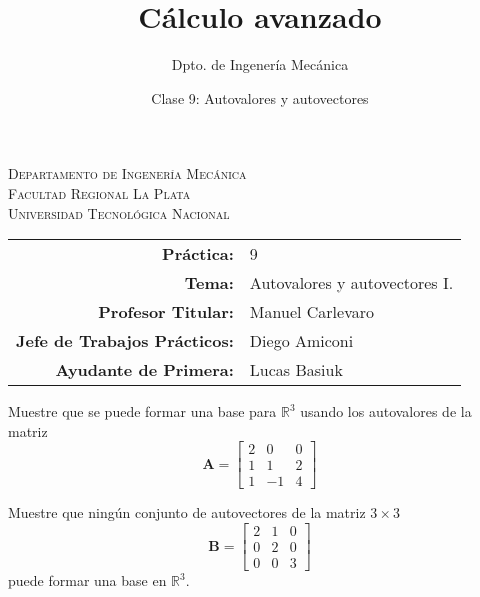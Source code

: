 \documentclass[11pt]{article}
\title{Cálculo avanzado}
\author{Dpto. de Ingenería Mecánica}
\date{Clase 9: Autovalores y autovectores}
\begin{document}

\begin{center}
\end{center} 

\begin{center}
\vspace{\baselineskip}
\Large{\textsc{Departamento de Ingenería Mecánica}} \\
\textsc{Facultad Regional La Plata} \\
\textsc{Universidad Tecnológica Nacional}
\end{center}


\begin{center}
\begin{tabular}{r l}
    \textbf{Práctica:} & 9 \\
 \textbf{Tema:} & Autovalores y autovectores I. \\
 \textbf{Profesor Titular:} & Manuel Carlevaro \\
 \textbf{Jefe de Trabajos Prácticos:} & Diego Amiconi \\
 \textbf{Ayudante de Primera:} & Lucas Basiuk 
\end{tabular}\end{center}

\vspace{1em}
\begin{question} %
    Muestre que se puede formar una base para $\mathbb{R}^3$ usando los autovalores de la matriz
    \[ \bm{A} = \begin{bmatrix} 2 & 0 & 0 \\
        1 & 1 & 2 \\
    1 & -1 & 4 \end{bmatrix} \]
\end{question}

\begin{question} %
Muestre que ningún conjunto de autovectores de la matriz $3 \times 3$
\[ \bm{B} = \begin{bmatrix} 2 & 1 & 0 \\
           0 & 2 & 0 \\
       0 & 0 & 3 \end{bmatrix} \]
       puede formar una base en $\mathbb{R}^3$.
\end{question}
\end{document}
